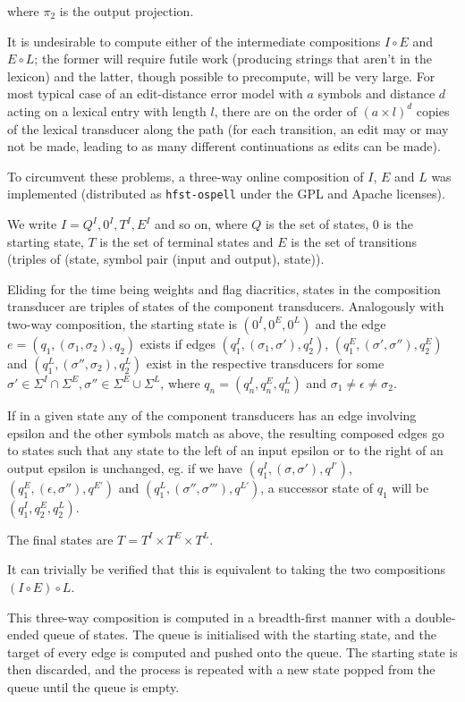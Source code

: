 \documentclass{llncs}
\begin{document}
where $\pi_2$ is the output projection.

It is undesirable to compute either of the intermediate compositions
$I \circ E$ and $E \circ L$; the former will require futile work (producing
strings that aren't in the lexicon) and the latter, though possible to
precompute, will be very large. For most typical case of an edit-distance
error model with $a$ symbols and distance $d$ acting on a lexical entry with
length $l$, there are on the order of $(a \times l)^d$
copies of the lexical transducer along the path (for each transition,
an edit may or may not be made, leading to as many different continuations
as edits can be made).

To circumvent these problems, a three-way online composition of $I$, $E$ and
$L$ was implemented (distributed as \verb!hfst-ospell!
under the GPL and Apache licenses).

We write $I = {Q^I, 0^I, T^I, E^I}$ and so on, where $Q$
is the set of states, $0$ is the starting state, $T$ is the set of terminal
states and $E$ is the set of transitions (triples of (state, symbol pair
(input and output), state)).

Eliding for the time being weights and flag diacritics, states in the
composition transducer are triples of states of the component transducers.
Analogously with two-way composition, the starting state is $(0^I, 0^E, 0^L)$
and the edge $e = (q_1, (\sigma_1, \sigma_2), q_2)$ exists if edges
$(q^I_1, (\sigma_1, \sigma'), q^I_2)$,
$(q^E_1, (\sigma', \sigma''), q^E_2)$ and
$(q^L_1, (\sigma'', \sigma_2), q^L_2)$ exist in the respective transducers
for some
$\sigma' \in \Sigma^I \cap \Sigma^E, \sigma'' \in \Sigma^E \cup \Sigma^L$,
where $q_n = (q^I_n, q^E_n, q^L_n)$ and $\sigma_1 \neq \epsilon \neq \sigma_2$.

If in a given state any of the component transducers has an edge involving
epsilon and the other symbols match as above, the resulting composed edges
go to states such that any state to the left of an input epsilon or to the
right of an output epsilon is unchanged, eg. if we have
$(q^I_1, (\sigma, \sigma'), q^{I'})$, $(q^E_1, (\epsilon, \sigma''), q^{E'})$ and
$(q^L_1, (\sigma'', \sigma'''), q^{L'})$, a successor state of $q_1$ will be
$(q^I_1, q^E_2, q^L_2)$.

The final states are $T = T^I \times T^E \times T^L$.

It can trivially be verified that this is equivalent to taking the two
compositions $(I \circ E) \circ L$.

This three-way composition is computed in a breadth-first manner with a
double-ended queue of states. The queue is initialised with the starting state,
and the target of every edge is computed and pushed onto the
queue. The starting state is then discarded, and the process is repeated
with a new state popped from the queue until the queue is empty.
\end{document}
